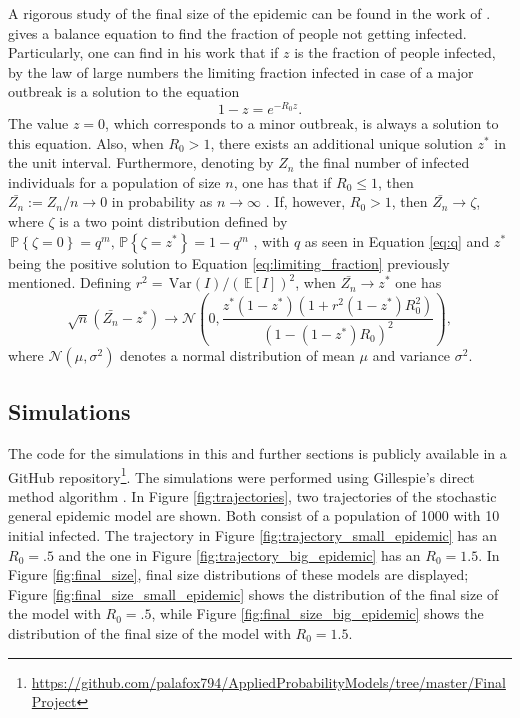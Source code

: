 \documentclass[aap]{imsart}
\newcommand\var[1]{\, \mathrm{Var} \left( #1 \right)}
\newcommand\pr[1]{\, \mathbb{P} \left\lbrace #1 \right\rbrace}
\newcommand\expec[1]{\, \mathbb{E} \left\lbrack #1 \right\rbrack}
\theoremstyle{remark}
\begin{document}
A rigorous study of the final size of the epidemic can be found in the work of \citet{Scalia-Tomba_1985, Scalia-Tomba_1990}. \citet{Britton_2010} gives a balance equation to find the fraction of people not getting infected. Particularly, one can find in his work \citep{Britton_2010} that if $z$ is the fraction of people infected, by the law of large numbers the limiting fraction infected in case of a major outbreak is a solution to the equation
\begin{equation}\label{eq:limiting_fraction}
	1-z = e^{-R_0 z}.
\end{equation}
The value $z = 0$, which corresponds to a minor outbreak, is always a solution to this equation. Also, when $R_0 > 1$, there exists an additional unique solution $z^\ast$ in the unit interval. Furthermore, denoting by $Z_n$ the final number of infected individuals for a population of size $n$, one has that if $R_0 \leq 1$, then $\bar{Z_n} := Z_n / n \rightarrow 0$ in probability as $n \rightarrow \infty$ \citep{Britton_2010}. If, however, $R_0 > 1$, then $\bar{Z_n} \rightarrow \zeta$, where $\zeta$ is a two point distribution defined by $\pr{\zeta = 0} = q^m, \pr{\zeta = z^\ast} = 1-q^m$ \citep{Britton_2010}, with $q$ as seen in Equation \ref{eq:q} and $z^\ast$ being the positive solution to Equation \ref{eq:limiting_fraction} previously mentioned. Defining $r^2 = \var{I} / (\expec{I})^2$, when $\bar{Z_n} \rightarrow z^\ast$ one has
\begin{equation}
	\sqrt{n} (\bar{Z_n} - z^\ast) \rightarrow \mathcal{N}\left(0, \frac{z^\ast (1-z^\ast)(1+r^2(1-z^\ast)R_{0}^{2}) }{(1-(1-z^\ast)R_{0})^2}\right),
\end{equation}
where $\mathcal{N}(\mu, \sigma^2)$ denotes a normal distribution of mean $\mu$ and variance $\sigma^2$.

\subsection{Simulations} \label{subs:simulation:}
The code for the simulations in this and further sections is publicly available in a GitHub repository\footnote{\url{https://github.com/palafox794/AppliedProbabilityModels/tree/master/FinalProject}}. The simulations were performed using Gillespie's direct method algorithm \citep{Drake_Rohani}. In Figure \ref{fig:trajectories}, two trajectories of the stochastic general epidemic model are shown. Both consist of a population of 1000 with 10 initial infected. The trajectory in Figure \ref{fig:trajectory_small_epidemic} has an $R_0 = .5$ and the one in Figure \ref{fig:trajectory_big_epidemic} has an $R_0 = 1.5$. In Figure \ref{fig:final_size}, final size distributions of these models are displayed; Figure \ref{fig:final_size_small_epidemic} shows the distribution of the final size of the model with $R_0 = .5$, while Figure \ref{fig:final_size_big_epidemic} shows the distribution of the final size of the model with $R_0 = 1.5$. 
\end{document}
